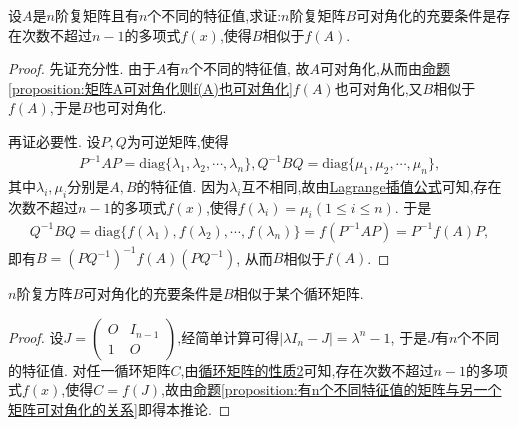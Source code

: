 \documentclass[../../main.tex]{subfiles}
\begin{document}
\begin{proposition}\label{proposition:有n个不同特征值的矩阵与另一个矩阵可对角化的关系}
设$A$是$n$阶复矩阵且有$n$个不同的特征值,求证:$n$阶复矩阵$B$可对角化的充要条件是存在次数不超过$n - 1$的多项式$f(x)$,使得$B$相似于$f(A)$.
\end{proposition}
\begin{proof}
先证充分性. 由于$A$有$n$个不同的特征值, 故$A$可对角化,从而由\hyperref[proposition:矩阵A可对角化则f(A)也可对角化]{命题\ref{proposition:矩阵A可对角化则f(A)也可对角化}}$f(A)$也可对角化,又$B$相似于$f(A)$,于是$B$也可对角化. 

再证必要性. 设$P,Q$为可逆矩阵,使得
\begin{align*}
P^{-1}AP=\mathrm{diag}\{\lambda_1,\lambda_2,\cdots,\lambda_n\}, Q^{-1}BQ=\mathrm{diag}\{\mu_1,\mu_2,\cdots,\mu_n\},
\end{align*}
其中$\lambda_i,\mu_i$分别是$A,B$的特征值. 因为$\lambda_i$互不相同,故由\hyperref[theorem:Lagrange插值公式]{Lagrange插值公式}可知,存在次数不超过$n - 1$的多项式$f(x)$,使得$f(\lambda_i)=\mu_i(1\leq i\leq n)$. 于是
\begin{align*}
Q^{-1}BQ=\mathrm{diag}\{f(\lambda_1),f(\lambda_2),\cdots,f(\lambda_n)\}=f(P^{-1}AP)=P^{-1}f(A)P,
\end{align*}
即有$B=(PQ^{-1})^{-1}f(A)(PQ^{-1})$, 从而$B$相似于$f(A)$. 
\end{proof}

\begin{corollary}\label{corollary:}
$n$阶复方阵$B$可对角化的充要条件是$B$相似于某个循环矩阵.
\end{corollary}
\begin{proof}
设$J=\begin{pmatrix}O&I_{n - 1}\\1&O\end{pmatrix}$,经简单计算可得$|\lambda I_n - J|=\lambda^n - 1$, 于是$J$有$n$个不同的特征值. 对任一循环矩阵$C$,由\hyperref[proposition:循环矩阵的性质]{循环矩阵的性质2}可知,存在次数不超过$n - 1$的多项式$f(x)$,使得$C = f(J)$,故由\hyperref[proposition:有n个不同特征值的矩阵与另一个矩阵可对角化的关系]{命题\ref{proposition:有n个不同特征值的矩阵与另一个矩阵可对角化的关系}}即得本推论.
\end{proof}
\end{document}
